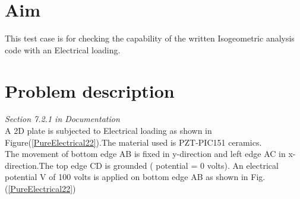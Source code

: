 \documentclass[12pt]{article}
\begin{document}
\section{Aim}
This test case is for checking the capability of the written Isogeometric analysis code with an Electrical loading.
\section{Problem description}\label{2DPWPELPD}
\emph{Section 7.2.1 in Documentation}\\
A 2D plate is subjected to Electrical loading as shown in Figure(\ref{PureElectrical22}).The material used is PZT-PIC151 ceramics.\\
The movement of bottom edge AB is fixed in y-direction and left edge AC in x-direction.The top edge CD is grounded ( potential = 0 volts). An electrical potential V of 100 volts is applied on bottom edge AB as shown in Fig. (\ref{PureElectrical22})
\end{document}
